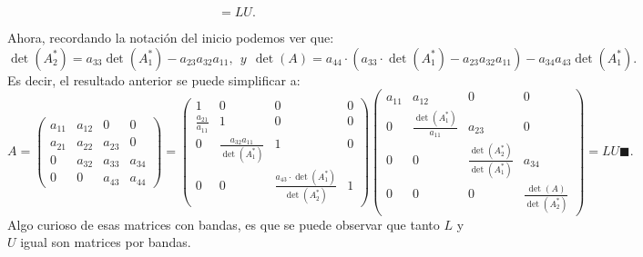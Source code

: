 \documentclass[11pt,letterpaper]{article}
\newcommand{\finf}{\blacksquare.}
\begin{document}
\begin{enumerate}
\begin{equation*}
=LU.
\end{equation*}

Ahora, recordando la notación del inicio podemos ver que:
$$\det (A_2^*)=a_{33}\det(A_1^*)-a_{23}a_{32}a_{11}, \ \ y\ \ \det(A)=a_{44}\cdot(a_{33}\cdot \det(A_1^*)-a_{23}a_{32}a_{11})-a_{34}a_{43}\det(A_1^*).$$
Es decir, el resultado anterior se puede simplificar a:
\begin{equation*}
A=\left(\begin{array}{cccc}
a_{11} & a_{12} &   0    &    0  \\
a_{21} & a_{22} & a_{23} &    0  \\
    0  & a_{32} & a_{33} & a_{34}\\
    0  &   0    & a_{43} & a_{44}
\end{array} \right)=
\left(\begin{array}{cccc}
 1 &  0 &  0 & 0\\
 \frac{a_{21}}{a_{11}} &  1 &  0 & 0\\
 0 &  \frac{a_{32}a_{11}}{\det(A_1^*)} &  1 & 0\\
 0 &  0 &  \frac{a_{43}\cdot \det(A_1^*)}{\det(A_2^*)} & 1
\end{array} \right) \left(\begin{array}{cccc}
 a_{11} &  a_{12} & 0 & 0\\
 0 & \frac{\det(A_1^*)}{a_{11}}&  a_{23} & 0\\
 0 &  0 &  \frac{\det(A_2^*)}{\det(A_1^*)} & a_{34}\\
 0 &  0 &  0 & \frac{\det(A)}{\det(A_2^*)}
\end{array} \right)=LU\finf
\end{equation*}
Algo curioso de esas matrices con bandas, es que se puede observar que tanto $L$ y $U$ igual son matrices por bandas.
\end{enumerate}
\end{document}
